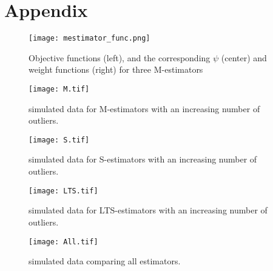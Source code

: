 \documentclass[conference]{IEEEtran}
\begin{document}
\section{Appendix}
\begin{figure}[h]
\centering
\texttt{[image: mestimator\_func.png]}
\caption{Objective functions (left), and the corresponding $\psi$ (center) and weight functions (right) for three M-estimators}
\end{figure}
\centering
\clearpage
\begin{figure}[t!]
\caption{simulated data for M-estimators with an increasing number of outliers.}
\texttt{[image: M.tif]}
\end{figure}
\centering
\begin{figure}[b!]
\caption{simulated data for S-estimators with an increasing number of outliers.}
\texttt{[image: S.tif]}
\end{figure}

\newpage
\clearpage
\begin{figure}[t!]
\caption{simulated data for LTS-estimators with an increasing number of outliers.}
\texttt{[image: LTS.tif]}
\end{figure}

\begin{figure}[b!]
\caption{simulated data comparing all estimators.}
\texttt{[image: All.tif]}
\end{figure}

{\small


}
\end{document}

